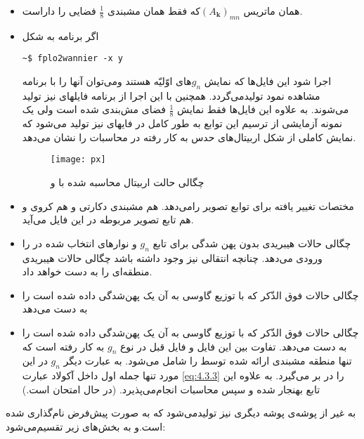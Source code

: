\begin{itemize}
  \item {}
  همان ماتریس $(A_{\mathbf{k}})_{mn}$که فقط همان مشبندی $\frac{1}{8}$ فضایی را داراست.
  \item{}
   اگر برنامه  به شکل
\begin{latin}
\begin{lstlisting}[style=Mybash]
 ~$ fplo2wannier -x y
\end{lstlisting}
\end{latin}
اجرا شود این فایل‌ها که نمایش $g_n$های اوّلیّه هستند و‌می‌توان آنها را با برنامه  مشاهده 
نمود تولید‌می‌گردد. همچنین با این اجرا از برنامه فایلهای  نیز تولید می‌شوند. به علاوه این 
فایل‌ها فقط نمایش $\frac{1}{8}$ فضای مش‌بندی شده است ولی یک نمونه آزمایشی از ترسیم این توابع به طور کامل 
در فایهای  نیز تولید می‌شود که نمایش کاملی از شکل اربیتال‌های حدس به کار رفته در محاسبات 
را نشان می‌دهد.
\begin{figure}[ht]
 \centering
 \texttt{[image: px]}
\caption{\label{fig:px}
چگالی حالت اربیتال  محاسبه شده با  و 
}
\end{figure}
\item{}
مختصات تغییر یافته برای توابع تصویر را‌می‌دهد. هم مشبندی دکارتی و هم کروی و هم تابع تصویر مربوطه در این فایل می‌آید.
\item{}
چگالی حالات هیبریدی بدون پهن شدگی برای تابع  $g_n$ و نوارهای انتخاب شده در را ورودی‌ می‌دهد. چنانچه انتقالی نیز وجود داشته باشد چگالی حالات هیبریدی منطقه‌ای را 
به دست خواهد داد. 
\item{}
چگالی حالات فوق الذّکر که با توزیع گاوسی به آن یک پهن‌شدگی داده شده است را به دست می‌دهد
\item{}
چگالی حالات فوق الذّکر که با توزیع گاوسی به آن یک پهن‌شدگی داده شده است را به دست می‌دهد. تفاوت بین این فایل و فایل قبل در 
نوع $g_n$ به کار رفته است که تنها منطقه مشبندی ارائه شده توسط  را شامل می‌شود. به عبارت دیگر 
$g_n$
در این مورد تنها جمله اول داخل آکولاد عبارت \ref{eq:4.3.3} را در بر می‌گیرد. به علاوه این تابع 
بهنجار شده و سپس محاسبات انجام‌می‌پذیرد. (در حال امتحان است.)
\end{itemize}
به غیر از پوشه‌ی پوشه دیگری نیز تولید‌می‌شود که به صورت پیش‌فرض  نام‌گذاری شده است.و به بخش‌های زیر تقسیم‌می‌شود:
